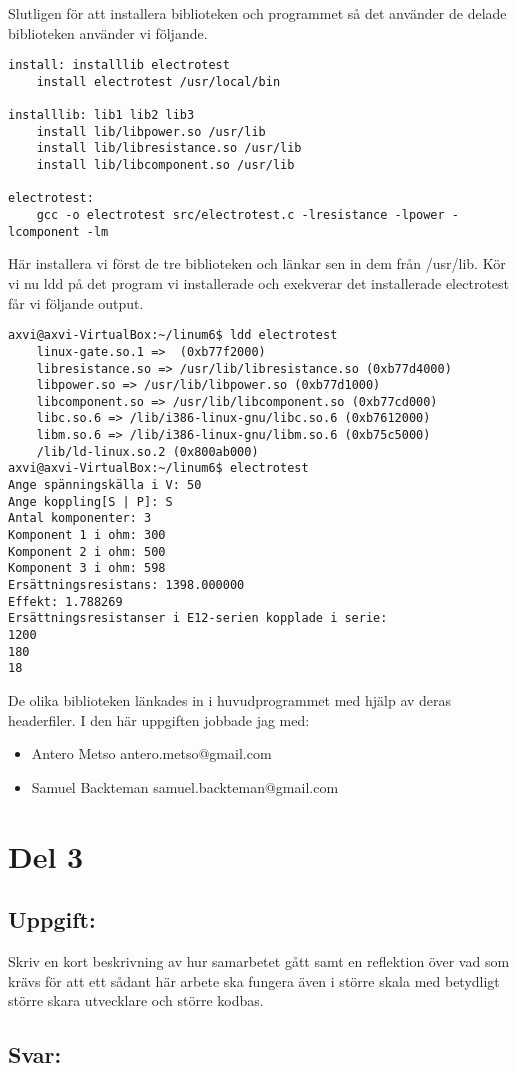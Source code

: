 \documentclass[10pt, a4paper]{article}
\begin{document}
Slutligen för att installera biblioteken och programmet så det använder de delade biblioteken använder vi följande.
\begin{verbatim}
install: installlib electrotest
    install electrotest /usr/local/bin

installlib: lib1 lib2 lib3
    install lib/libpower.so /usr/lib
    install lib/libresistance.so /usr/lib
    install lib/libcomponent.so /usr/lib

electrotest: 
    gcc -o electrotest src/electrotest.c -lresistance -lpower -lcomponent -lm
\end{verbatim}
Här installera vi först de tre biblioteken och länkar sen in dem från /usr/lib.
Kör vi nu ldd på det program vi installerade och exekverar det installerade electrotest får vi följande output.
\begin{verbatim}
axvi@axvi-VirtualBox:~/linum6$ ldd electrotest 
    linux-gate.so.1 =>  (0xb77f2000)
    libresistance.so => /usr/lib/libresistance.so (0xb77d4000)
    libpower.so => /usr/lib/libpower.so (0xb77d1000)
    libcomponent.so => /usr/lib/libcomponent.so (0xb77cd000)
    libc.so.6 => /lib/i386-linux-gnu/libc.so.6 (0xb7612000)
    libm.so.6 => /lib/i386-linux-gnu/libm.so.6 (0xb75c5000)
    /lib/ld-linux.so.2 (0x800ab000)
axvi@axvi-VirtualBox:~/linum6$ electrotest 
Ange spänningskälla i V: 50
Ange koppling[S | P]: S
Antal komponenter: 3
Komponent 1 i ohm: 300
Komponent 2 i ohm: 500
Komponent 3 i ohm: 598
Ersättningsresistans: 1398.000000
Effekt: 1.788269
Ersättningsresistanser i E12-serien kopplade i serie:
1200
180
18
\end{verbatim}

De olika biblioteken länkades in i huvudprogrammet med hjälp av deras headerfiler. I den här uppgiften jobbade jag med:

\begin{itemize}
    \item Antero Metso antero.metso@gmail.com
    \item Samuel Backteman samuel.backteman@gmail.com
\end{itemize}

\cleardoublepage

\section*{Del 3}\label{sec:del3}

\subsection*{Uppgift:}
Skriv en kort beskrivning av hur samarbetet gått samt en reflektion över vad som krävs för att ett sådant här arbete ska fungera även i större skala med betydligt större skara utvecklare och större kodbas.
 
\subsection*{Svar:}




%  
\end{document}
